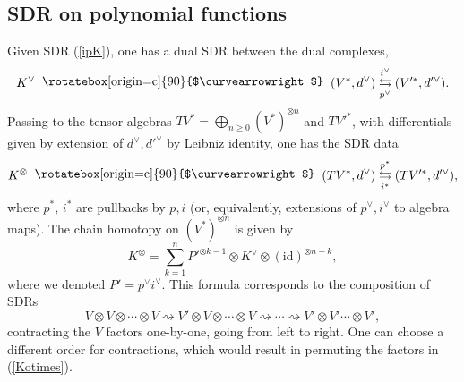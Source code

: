 \documentclass{amsart}
\theoremstyle{plain} %
\theoremstyle{definition}
\theoremstyle{remark}
\newcommand{\mr}{\mathrm}
\newcommand{\SDR}[5]{#5\;\;\raisebox{1.3pt}{\rotatebox[origin=c]{90}{$\curvearrowright$}}\;\; #1 \underset{#4}{\stackrel{#3}{\leftrightarrows}} #2}  %
\begin{document}
\subsection{SDR on polynomial functions}\label{ss: SDR on polynomial functions}
Given SDR (\ref{ipK}), one has a dual SDR between the dual complexes,
\begin{equation}\label{SDR dual}
    \SDR{(V^*,d^\vee)}{(V'^*,d'^\vee)}{i^\vee}{p^\vee}{ K^\vee}.
\end{equation}
Passing to the tensor algebras $TV^*=\bigoplus_{n\geq 0} (V^*)^{\otimes n}$ and $TV'^*$, with differentials given by extension of $d^\vee, d'^\vee$ by Leibniz identity, one has the SDR data
\begin{equation}
    \SDR{(TV^*,d^\vee)}{(TV'^*,d'^\vee)}{p^*}{i^*}{K^\otimes},
\end{equation}
where $p^*$, $i^*$ are pullbacks by $p,i$ (or, equivalently, extensions of $p^\vee,i^\vee$ to algebra maps). The chain homotopy on $(V^*)^{\otimes n}$ is given by
\begin{equation}\label{Kotimes}
    K^\otimes= \sum_{k=1}^{n} %
    P'^{\otimes k-1}\otimes K^\vee \otimes (\mr{id})^{\otimes n-k},
\end{equation}
where we denoted $P'=p^\vee i^\vee$.
This formula corresponds to the composition of SDRs
\begin{equation}
V\otimes V\otimes\cdots \otimes V \rightsquigarrow V'\otimes V\otimes \cdots \otimes V\rightsquigarrow \cdots \rightsquigarrow V'\otimes V'\cdots \otimes V',
\end{equation}
contracting the $V$ factors one-by-one, going from left to right. One can choose a different order for contractions, which would result in permuting the factors in (\ref{Kotimes}).
\end{document}

